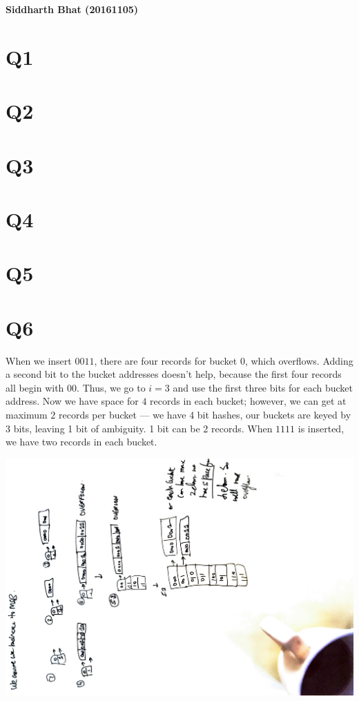 \documentclass{article}
\begin{document}
\textbf{Siddharth Bhat (20161105)}

\section{Q1}
\section{Q2}
\section{Q3}
\section{Q4}
\section{Q5}
\section{Q6}

When we insert $0011$, there are four records for bucket 0, which overflows.
Adding a second bit to the bucket addresses doesn't help, because the first
four records all begin with $00$. Thus, we go to $i = 3$ and use the first three
bits for each bucket address. Now we have space for $4$ records in each bucket;
however, we can get at maximum $2$ records per bucket --- we have 4 bit hashes,
our buckets are keyed by 3 bits, leaving 1 bit of ambiguity. 1 bit 
can be 2 records. When $1111$ is inserted, we have two records in each bucket.

\includegraphics[width=\textwidth, angle=270]{db-q6.pdf}
\end{document}

